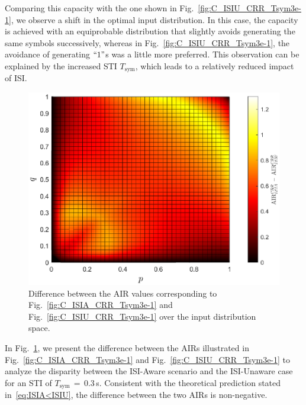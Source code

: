 \documentclass[journal]{IEEEtranTCOM}
\begin{document}
Comparing this capacity with the one shown in Fig.~\ref{fig:C_ISIU_CRR_Tsym3e-1}, we observe a shift in the optimal input distribution. In this case, the capacity is achieved with an equiprobable distribution that slightly avoids generating the same symbols successively, whereas in Fig.~\ref{fig:C_ISIU_CRR_Tsym3e-1}, the avoidance of generating $``1"$s was a little more preferred. This observation can be explained by the increased STI $T_{\mathrm{sym}}$, which leads to a relatively reduced impact of ISI.
\begin{figure}
    \centering
    \includegraphics[width=1\linewidth]{Figures/DIFF_ISI_CRR_Tsym3e-1.eps}
    \caption{Difference between the AIR values corresponding to Fig.~\ref{fig:C_ISIA_CRR_Tsym3e-1} and Fig.~\ref{fig:C_ISIU_CRR_Tsym3e-1} over the input distribution space.}
    \label{fig:Diff_C_ISI_CRR_Tsym3e-1}
\end{figure}
\par In Fig.~\ref{fig:Diff_C_ISI_CRR_Tsym3e-1}, we present the difference between the AIRs illustrated in Fig.~\ref{fig:C_ISIA_CRR_Tsym3e-1} and Fig.~\ref{fig:C_ISIU_CRR_Tsym3e-1} to analyze the disparity between the ISI-Aware scenario and the ISI-Unaware case for an STI of $T_{\mathrm{sym}}$$\,=\,$$0.3$\,s. Consistent with the theoretical prediction stated in~\eqref{eq:ISIA<ISIU}, the difference between the two AIRs is non-negative.
\end{document}

